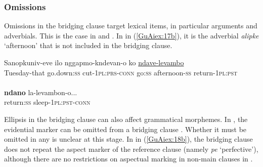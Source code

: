 \documentclass[output=paper]{LSP/langsci}
\begin{document}
\subsubsection{Omissions}
\label{GuAi312omiss}
Omissions in the bridging clause target lexical items, in particular arguments and adverbials. This is the case in  \citep[][121]{Phinnemore1998} and  \citep{devries.2005}. In  in (\ref{GuAiex:17b}), it is the adverbial \textit{alipke} ‘afternoon’ that is not included in the bridging clause.

\begin{exe}
\ex \label{GuAiex:17ab}
\begin{xlist}
\ex \label{GuAiex:17a}
\gll Sanopkuniv-eve   ilo     nggapmo-kndevan-o   ko \underline{}   \underline{ndave-levambo}\\
Tuesday-that    go.down:\textsc{ss}   cut-\textsc{1pl:prs-conn}  go:\textsc{ss} afternoon-\textsc{ss}  return-\textsc{1pl:pst}\\
\glt {} \\
\ex \label{GuAiex:17b}
\gll \textbf{ndano} la-levambon-o... \\
return:\textsc{ss}   sleep-\textsc{1pl:pst-conn} \\
\glt {}
\end{xlist}
\end{exe}

Ellipsis in the bridging clause can also affect grammatical morphemes. In , the evidential marker can be omitted from a bridging clause \citep[][392]{schulze73}. Whether it must be omitted in any  is unclear at this stage. In  in (\ref{GuAiex:18b}), the bridging clause does not repeat the aspect marker of the reference clause (namely \textit{pe} ‘perfective’), although there are no restrictions on aspectual marking in non-main clauses in  \citep[][419]{Schokkin13}.
\end{document}

